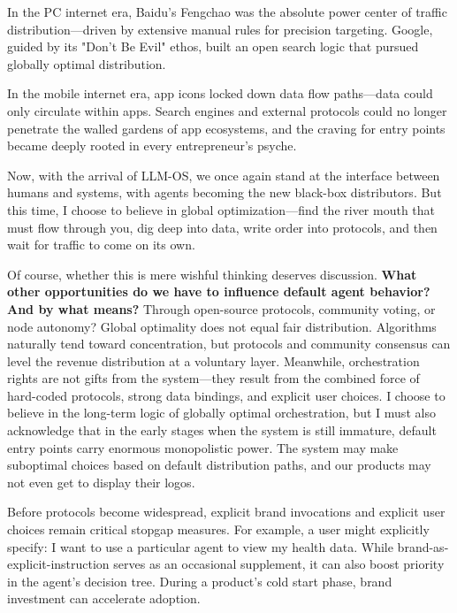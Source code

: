 In the PC internet era, Baidu's Fengchao was the absolute power center of traffic distribution---driven by extensive manual rules for precision targeting. Google, guided by its "Don't Be Evil" ethos, built an open search logic that pursued globally optimal distribution.

In the mobile internet era, app icons locked down data flow paths---data could only circulate within apps. Search engines and external protocols could no longer penetrate the walled gardens of app ecosystems, and the craving for entry points became deeply rooted in every entrepreneur's psyche.

Now, with the arrival of LLM-OS, we once again stand at the interface between humans and systems, with agents becoming the new black-box distributors. But this time, I choose to believe in global optimization---find the river mouth that must flow through you, dig deep into data, write order into protocols, and then wait for traffic to come on its own.

\vspace{1em}

Of course, whether this is mere wishful thinking deserves discussion. \textbf{What other opportunities do we have to influence default agent behavior? And by what means?} Through open-source protocols, community voting, or node autonomy? Global optimality does not equal fair distribution. Algorithms naturally tend toward concentration, but protocols and community consensus can level the revenue distribution at a voluntary layer. Meanwhile, orchestration rights are not gifts from the system---they result from the combined force of hard-coded protocols, strong data bindings, and explicit user choices. I choose to believe in the long-term logic of globally optimal orchestration, but I must also acknowledge that in the early stages when the system is still immature, default entry points carry enormous monopolistic power. The system may make suboptimal choices based on default distribution paths, and our products may not even get to display their logos.

\vspace{1em}

Before protocols become widespread, explicit brand invocations and explicit user choices remain critical stopgap measures. For example, a user might explicitly specify: {\kaiti I want to use a particular agent to view my health data.} While brand-as-explicit-instruction serves as an occasional supplement, it can also boost priority in the agent's decision tree. During a product's cold start phase, brand investment can accelerate adoption.

